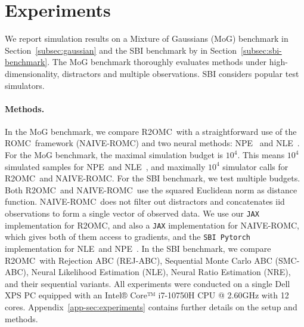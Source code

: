 \documentclass[twoside]{article}
\newcommand{\rromc}{R2OMC}
\newcommand{\romc}{ROMC}
\newcommand{\nromc}{NAIVE-ROMC}
\newcommand{\REJ}{REJ-ABC}
\newcommand{\SMC}{SMC-ABC}
\newcommand{\NPE}{NPE}
\newcommand{\NLE}{NLE}
\newcommand{\NRE}{NRE}
\begin{document}

\section{Experiments}
\label{sec:experiments}

We report simulation results on a Mixture of Gaussians (MoG) benchmark in Section~\ref{subsec:gaussian} and the SBI  benchmark by \citet{lueckmann2021benchmarking} in Section~\ref{subsec:sbi-benchmark}.
The MoG benchmark thoroughly evaluates methods under high-dimensionality, distractors and multiple observations.
SBI considers popular test simulators.

\paragraph{Methods.}
In the MoG benchmark, we compare \rromc~with a straightforward use of the \romc~framework (\nromc) and two neural methods: \NPE~\citep[specifically, ``SNPE-C'' by][]{greenberg2019automatic} and \NLE~\citep[specifically, ``NLE-A'' by][]{papamakarios2019sequential}.
For the MoG benchmark, the maximal simulation budget is $10^4$. This means $10^4$ simulated samples for \NPE~and \NLE~, and maximally $10^4$ simulator calls for \rromc~and \nromc. For the SBI benchmark, we test multiple budgets.
Both \rromc~and \nromc~use the squared Euclidean norm as distance function.
\nromc~does not filter out distractors and concatenates iid observations to form a single vector of observed data. 
%
We use our \texttt{JAX} implementation for \rromc, and also a \texttt{JAX} implementation for \nromc, which gives both of them access to gradients, and the \texttt{SBI Pytorch} implementation for \NLE~and \NPE~\citep{tejero-cantero2020sbi}.
%
In the SBI benchmark, we compare \rromc~with Rejection ABC (\REJ), Sequential Monte Carlo ABC (\SMC), Neural Likelihood Estimation (\NLE), Neural Ratio Estimation (\NRE), and their sequential variants.
%
All experiments were conducted on a single Dell XPS PC equipped with an Intel® Core™ i7-10750H CPU @ 2.60GHz with 12 cores.
%
Appendix~\ref{app-sec:experiments} contains further details on the setup and methods.
%
\end{document}
